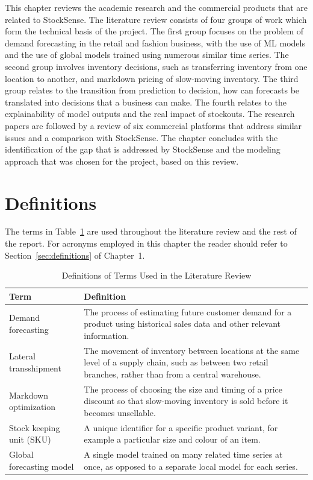 \documentclass{StockSense}
\begin{document}
This chapter reviews the academic research and the commercial products that are related to StockSense. The literature review consists of four groups of work which form the technical basis of the project. The first group focuses on the problem of demand forecasting in the retail and fashion business, with the use of ML models and the use of global models trained using numerous similar time series. The second group involves inventory decisions, such as transferring inventory from one location to another, and markdown pricing of slow-moving inventory. The third group relates to the transition from prediction to decision, how can forecasts be translated into decisions that a business can make. The fourth relates to the explainability of model outputs and the real impact of stockouts. The research papers are followed by a review of six commercial platforms that address similar issues and a comparison with StockSense. The chapter concludes with the identification of the gap that is addressed by StockSense and the modeling approach that was chosen for the project, based on this review.

\section{Definitions}

The terms in Table~\ref{tab:definitions} are used throughout the literature review and the rest of the report. For acronyms employed in this chapter the reader should refer to Section~\ref{sec:definitions} of Chapter~1.

\begin{table}[htbp]
\centering
\caption{Definitions of Terms Used in the Literature Review}
\label{tab:definitions}
\begin{tabular}{|p{3.6cm}|p{10.2cm}|}
\hline
\textbf{Term} & \textbf{Definition} \\ \hline
Demand forecasting & The process of estimating future customer demand for a product using historical sales data and other relevant information. \\ \hline
Lateral transshipment & The movement of inventory between locations at the same level of a supply chain, such as between two retail branches, rather than from a central warehouse. \\ \hline
Markdown optimization & The process of choosing the size and timing of a price discount so that slow-moving inventory is sold before it becomes unsellable. \\ \hline
Stock keeping unit (SKU) & A unique identifier for a specific product variant, for example a particular size and colour of an item. \\ \hline
Global forecasting model & A single model trained on many related time series at once, as opposed to a separate local model for each series. \\ \hline
\end{tabular}
\end{table}
\end{document}
